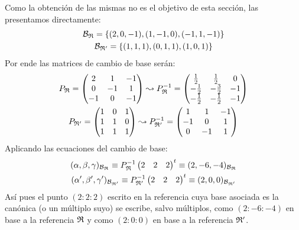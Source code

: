 \begin{exa}
	Como la obtención de las mismas no es el objetivo de esta sección, las presentamos directamente:
	\begin{gather*}
		\mathcal{B}_{\mathfrak{R}}=\{(2,0,-1),(1,-1,0),(-1,1,-1)\}\\
		\mathcal{B}_{\mathfrak{R}'}=\{(1,1,1),(0,1,1),(1,0,1)\}
	\end{gather*}
	Por ende las matrices de cambio de base serán:
	\begin{gather*}
			P_{\mathfrak{R}}=\begin{pmatrix}
				2 & 1 & -1\\
				0 & -1 & 1\\
				-1 & 0 & -1
			\end{pmatrix}\leadsto P_{\mathfrak{R}}^{-1}=\begin{pmatrix}
			\frac{1}{2} & \frac{1}{2} & 0 \\
			-\frac{1}{2} & -\frac{3}{2} & -1 \\
			-\frac{1}{2} & -\frac{1}{2} & -1
		\end{pmatrix}\\
			P_{\mathfrak{R}'}=\begin{pmatrix}
				1 & 0 & 1\\
				1 & 1 & 0\\
				1 & 1 & 1
			\end{pmatrix}\leadsto P_{\mathfrak{R}'}^{-1}=\begin{pmatrix}
			1 & 1 & -1 \\
			-1 & 0 & 1 \\
			0 & -1 & 1
		\end{pmatrix}
	\end{gather*}
	Aplicando las ecuaciones del cambio de base:
	\begin{gather*}
		(\alpha,\beta,\gamma)_{\mathcal{B}_{\mathfrak{R}}}\equiv P_{\mathfrak{R}}^{-1}\begin{pmatrix}
			2 & 2 & 2
		\end{pmatrix}^t\equiv(2,-6,-4)_{\mathcal{B}_{\mathfrak{R}}}\\
		(\alpha',\beta',\gamma')_{\mathcal{B}_{\mathfrak{R}'}}\equiv P_{\mathfrak{R}'}^{-1}\begin{pmatrix}
			2 & 2 & 2
		\end{pmatrix}^t\equiv (2,0,0)_{\mathcal{B}_{\mathfrak{R}'}}
	\end{gather*}
	Así pues el punto $(2:2:2)$ escrito en la referencia cuya base asociada es la canónica (o un múltiplo suyo) se escribe, salvo múltiplos, como $(2:-6:-4)$ en base a la referencia $\mathfrak{R}$ y como $(2:0:0)$ en base a la referencia $\mathfrak{R}'$.
	

\end{exa}

